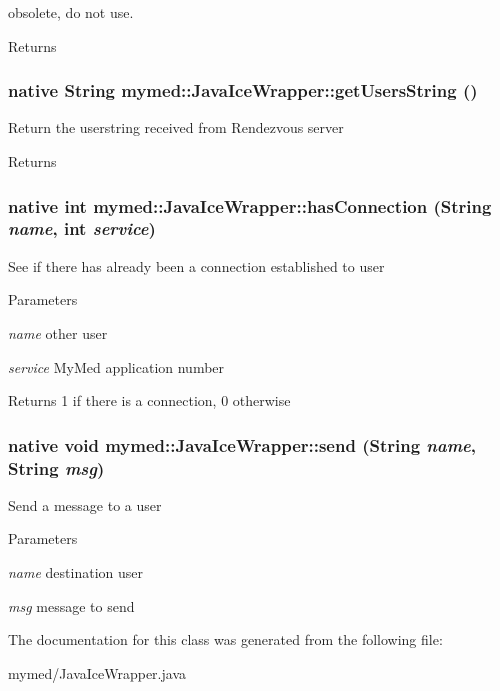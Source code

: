 \label{classmymed_1_1JavaIceWrapper_a800d9af066725c394979d86aabb10ba8}
obsolete, do not use. \begin{DoxyReturn}{Returns}

\end{DoxyReturn}
\hypertarget{classmymed_1_1JavaIceWrapper_af9bc0222407efaa31cb5237dbc3056c2}{
\subsubsection[{getUsersString}]{\setlength{\rightskip}{0pt plus 5cm}native String mymed::JavaIceWrapper::getUsersString ()}}
\label{classmymed_1_1JavaIceWrapper_af9bc0222407efaa31cb5237dbc3056c2}
Return the userstring received from Rendezvous server \begin{DoxyReturn}{Returns}

\end{DoxyReturn}
\hypertarget{classmymed_1_1JavaIceWrapper_af06e8244e449b1b5e65948ea70581d6a}{
\subsubsection[{hasConnection}]{\setlength{\rightskip}{0pt plus 5cm}native int mymed::JavaIceWrapper::hasConnection (String {\em name}, \/  int {\em service})}}
\label{classmymed_1_1JavaIceWrapper_af06e8244e449b1b5e65948ea70581d6a}
See if there has already been a connection established to user 
\begin{DoxyParams}{Parameters}
\item[{\em name}]other user \item[{\em service}]MyMed application number \end{DoxyParams}
\begin{DoxyReturn}{Returns}
1 if there is a connection, 0 otherwise 
\end{DoxyReturn}
\hypertarget{classmymed_1_1JavaIceWrapper_ae3d2b5589121f5d5f0184aea567fd4e5}{
\subsubsection[{send}]{\setlength{\rightskip}{0pt plus 5cm}native void mymed::JavaIceWrapper::send (String {\em name}, \/  String {\em msg})}}
\label{classmymed_1_1JavaIceWrapper_ae3d2b5589121f5d5f0184aea567fd4e5}
Send a message to a user 
\begin{DoxyParams}{Parameters}
\item[{\em name}]destination user \item[{\em msg}]message to send \end{DoxyParams}


The documentation for this class was generated from the following file:\begin{DoxyCompactItemize}
\item 
mymed/JavaIceWrapper.java\end{DoxyCompactItemize}
